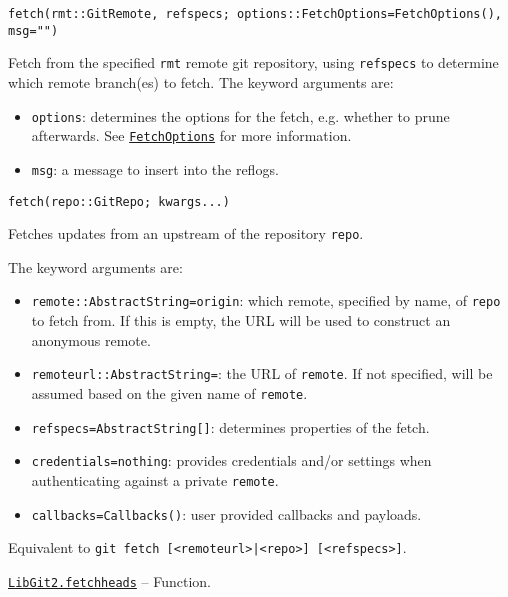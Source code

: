 \begin{adjustwidth}{2em}{0pt}


\begin{verbatim}
fetch(rmt::GitRemote, refspecs; options::FetchOptions=FetchOptions(), msg="")
\end{verbatim}

Fetch from the specified \texttt{rmt} remote git repository, using \texttt{refspecs} to determine which remote branch(es) to fetch. The keyword arguments are:

\begin{itemize}
\item \texttt{options}: determines the options for the fetch, e.g. whether to prune afterwards. See \hyperlink{7474664468985945267}{\texttt{FetchOptions}} for more information.


\item \texttt{msg}: a message to insert into the reflogs.

\end{itemize}



\begin{lstlisting}
fetch(repo::GitRepo; kwargs...)
\end{lstlisting}

Fetches updates from an upstream of the repository \texttt{repo}.

The keyword arguments are:

\begin{itemize}
\item \texttt{remote::AbstractString={\textquotedbl}origin{\textquotedbl}}: which remote, specified by name, of \texttt{repo} to fetch from. If this is empty, the URL will be used to construct an anonymous remote.


\item \texttt{remoteurl::AbstractString={\textquotedbl}{\textquotedbl}}: the URL of \texttt{remote}. If not specified, will be assumed based on the given name of \texttt{remote}.


\item \texttt{refspecs=AbstractString[]}: determines properties of the fetch.


\item \texttt{credentials=nothing}: provides credentials and/or settings when authenticating against a private \texttt{remote}.


\item \texttt{callbacks=Callbacks()}: user provided callbacks and payloads.

\end{itemize}
Equivalent to \texttt{git fetch [<remoteurl>|<repo>] [<refspecs>]}.



\end{adjustwidth}
\hypertarget{17606053504537858539}{} 
\hyperlink{17606053504537858539}{\texttt{LibGit2.fetchheads}}  -- {Function.}

